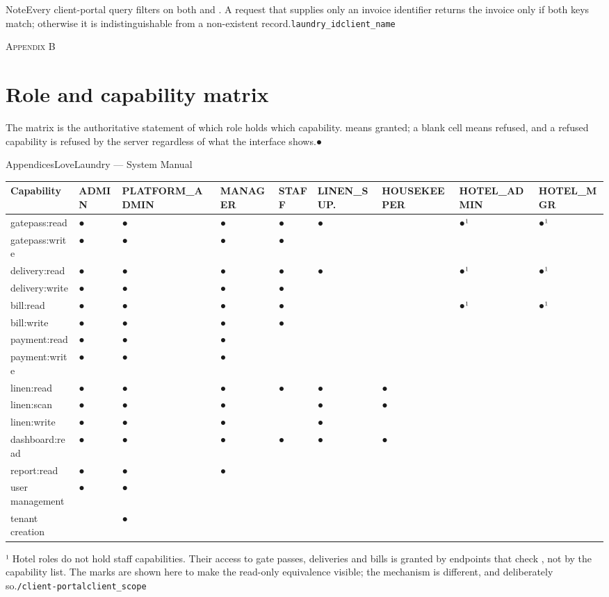 \documentclass[11pt,a4paper,oneside]{book}
\begin{document}
\begin{notebox}NoteEvery client-portal query filters on both  and . A request that supplies only an invoice identifier returns the invoice only if both keys match; otherwise it is indistinguishable from a non-existent record.\texttt{laundry\_id}\texttt{client\_name}\end{notebox}
\textsc{\small\color{crimson}Appendix B}\par\medskip
\section*{Role and capability matrix}
The matrix is the authoritative statement of which role holds which capability.  means granted; a blank cell means refused, and a refused capability is refused by the server regardless of what the interface shows.●

AppendicesLoveLaundry — System Manual

\begin{center}\small
\begin{tabularx}{\linewidth}{|X|X|X|X|X|X|X|X|X|}
\hline
\rowcolor{lightgrey}
\textbf{Capability} & \textbf{ADMIN} & \textbf{PLATFORM\_ADMIN} & \textbf{MANAGER} & \textbf{STAFF} & \textbf{LINEN\_SUP.} & \textbf{HOUSEKEEPER} & \textbf{HOTEL\_ADMIN} & \textbf{HOTEL\_MGR} \\ \hline
gatepass:read & ● & ● & ● & ● & ● &  & ●¹ & ●¹ \\ \hline
gatepass:write & ● & ● & ● & ● &  &  &  &  \\ \hline
delivery:read & ● & ● & ● & ● & ● &  & ●¹ & ●¹ \\ \hline
delivery:write & ● & ● & ● & ● &  &  &  &  \\ \hline
bill:read & ● & ● & ● & ● &  &  & ●¹ & ●¹ \\ \hline
bill:write & ● & ● & ● & ● &  &  &  &  \\ \hline
payment:read & ● & ● & ● &  &  &  &  &  \\ \hline
payment:write & ● & ● & ● &  &  &  &  &  \\ \hline
linen:read & ● & ● & ● & ● & ● & ● &  &  \\ \hline
linen:scan & ● & ● & ● &  & ● & ● &  &  \\ \hline
linen:write & ● & ● & ● &  & ● &  &  &  \\ \hline
dashboard:read & ● & ● & ● & ● & ● & ● &  &  \\ \hline
report:read & ● & ● & ● &  &  &  &  &  \\ \hline
user management & ● & ● &  &  &  &  &  &  \\ \hline
tenant creation &  & ● &  &  &  &  &  &  \\ \hline
\end{tabularx}
\end{center}
¹ Hotel roles do not hold staff capabilities. Their access to gate passes, deliveries and bills is granted by  endpoints that check , not by the capability list. The marks are shown here to make the read-only equivalence visible; the mechanism is different, and deliberately so.\texttt{/client-portal}\texttt{client\_scope}
\end{document}
